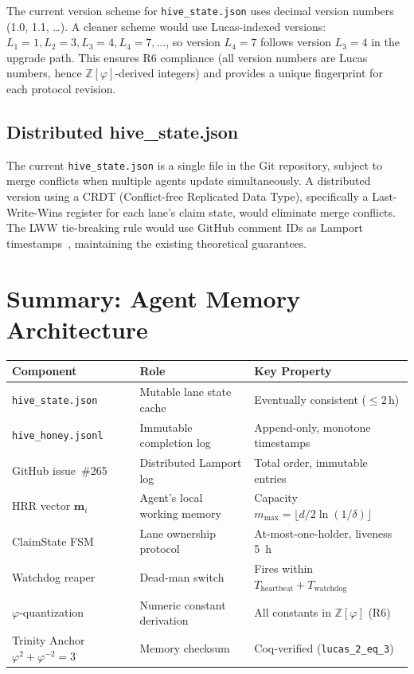 The current version scheme for \texttt{hive\_state.json} uses decimal
version numbers (1.0, 1.1, \ldots). A cleaner scheme would use
Lucas-indexed versions: $L_1 = 1, L_2 = 3, L_3 = 4, L_4 = 7, \ldots$,
so version $L_4 = 7$ follows version $L_3 = 4$ in the upgrade path.
This ensures R6 compliance (all version numbers are Lucas numbers,
hence $\mathbb{Z}[\varphi]$-derived integers) and provides a unique
fingerprint for each protocol revision.

\subsection{Distributed hive\_state.json}
\label{ssec:K-distributed-state}

The current \texttt{hive\_state.json} is a single file in the Git
repository, subject to merge conflicts when multiple agents update
simultaneously. A distributed version using a CRDT (Conflict-free
Replicated Data Type), specifically a Last-Write-Wins register for
each lane's claim state, would eliminate merge conflicts. The LWW
tie-breaking rule would use GitHub comment IDs as Lamport
timestamps~\cite{lamport_time_clocks}, maintaining the existing
theoretical guarantees.


\section{Summary: Agent Memory Architecture}
\label{sec:K-summary}

\begin{center}
\begin{tabular}{lll}
\hline
\textbf{Component} & \textbf{Role} & \textbf{Key Property} \\
\hline
\texttt{hive\_state.json} &
  Mutable lane state cache &
  Eventually consistent ($\leq 2\,\text{h}$) \\
\texttt{hive\_honey.jsonl} &
  Immutable completion log &
  Append-only, monotone timestamps \\
GitHub issue~\#265 &
  Distributed Lamport log &
  Total order, immutable entries \\
HRR vector $\mathbf{m}_i$ &
  Agent's local working memory &
  Capacity $m_{\max} = \lfloor d/2\ln(1/\delta)\rfloor$ \\
ClaimState FSM &
  Lane ownership protocol &
  At-most-one-holder, liveness 5~h \\
Watchdog reaper &
  Dead-man switch &
  Fires within $T_{\text{heartbeat}} + T_{\text{watchdog}}$ \\
$\varphi$-quantization &
  Numeric constant derivation &
  All constants in $\mathbb{Z}[\varphi]$ (R6) \\
Trinity Anchor $\varphi^2+\varphi^{-2}=3$ &
  Memory checksum &
  Coq-verified (\texttt{lucas\_2\_eq\_3}) \\
\hline
\end{tabular}
\end{center}

